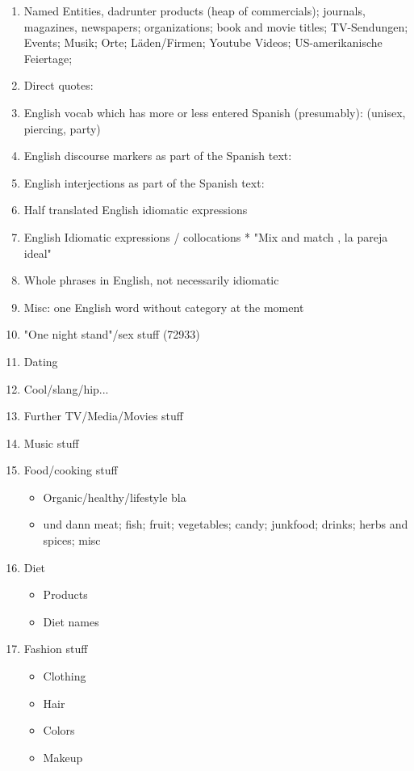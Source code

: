 \begin{enumerate}
  \item Named Entities, dadrunter products (heap of commercials); journals, magazines, newspapers; organizations; book and movie titles; TV-Sendungen; Events; Musik; Orte; Läden/Firmen; Youtube Videos; US-amerikanische Feiertage;
  \item Direct quotes:
  \item English vocab which has more or less entered Spanish (presumably): (unisex, piercing, party)
  \item English discourse markers as part of the Spanish text:
  \item English interjections as part of the Spanish text:
  \item Half translated English idiomatic expressions
  \item English Idiomatic expressions / collocations
    * "Mix and match , la pareja ideal"
  \item Whole phrases in English, not necessarily idiomatic %
  \item Misc: one English word without category at the moment
  \item "One night stand"/sex stuff (72933)
  \item Dating
  \item Cool/slang/hip...
  \item Further TV/Media/Movies stuff
  \item Music stuff
  \item Food/cooking stuff
    \begin{itemize}
      \item Organic/healthy/lifestyle bla
      \item und dann meat; fish; fruit; vegetables; candy; junkfood; drinks; herbs and spices; misc
    \end{itemize}
  \item Diet
    \begin{itemize}
      \item Products
      \item Diet names
    \end{itemize}
  \item Fashion stuff
    \begin{itemize}
      \item Clothing
      \item Hair
      \item Colors
      \item Makeup

\end{itemize}
\end{enumerate}
